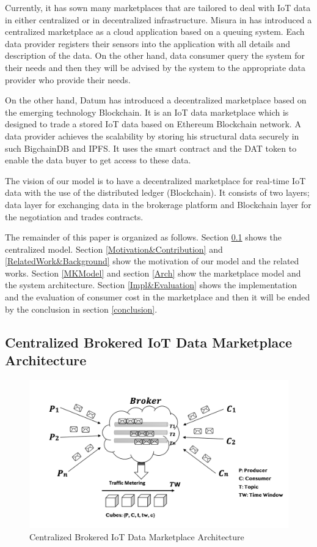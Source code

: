\documentclass[letterpaper, 10 pt, conference]{ieeeconf}  %
\begin{document}
Currently, it has sown many marketplaces that are tailored to deal with IoT data in either centralized or in decentralized infrastructure. Misura in \cite{misura} has introduced a centralized marketplace as a cloud application based on a queuing system. Each data provider registers their sensors into the application with all details and description of the data. On the other hand, data consumer query the system for their needs and then  they will be advised by the system to the appropriate data provider who provide their needs. 

On the other hand, Datum \cite{24} has introduced a decentralized marketplace based on the emerging technology Blockchain. It is an IoT data marketplace which is designed to trade a stored IoT data based on Ethereum Blockchain network. A data provider achieves the scalability by storing his structural data securely in such BigchainDB and IPFS.  It uses the smart contract and the DAT token to enable the data buyer to get access to these data. 

The vision of our model is to have a decentralized marketplace for real-time IoT data with the use of the distributed ledger (Blockchain). It consists of two layers; data layer for exchanging data in the brokerage platform and Blockchain layer for the negotiation and trades contracts.

The remainder of this paper is organized as follows. Section \ref{CentModel} shows the centralized model. Section \ref{Motivation&Contribution} and \ref{RelatedWork&Background} show the motivation of our model and the related works. Section \ref{MKModel} and section \ref{Arch} show the marketplace model and the system architecture. Section \ref{Impl&Evaluation} shows the implementation and the evaluation of  consumer cost in the marketplace and then it will be ended by the conclusion in section \ref{conclusion}.

\subsection{Centralized Brokered IoT Data Marketplace Architecture} \label{CentModel}

\begin{figure}
  \caption{Centralized Brokered IoT Data Marketplace Architecture}
  \label{fig:brokered-data-exchange}
  \includegraphics[scale=0.4]{Cent}

\end{figure}
\end{document}
